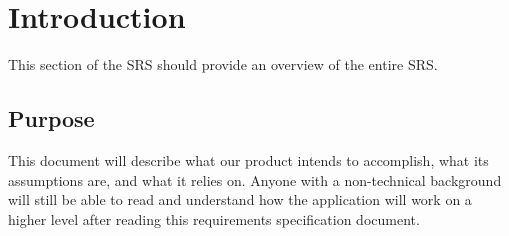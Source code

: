 \documentclass[english]{article}
\begin{document}
\vspace*{\fill} 
\vspace*{\fill} 

\newpage

\tableofcontents

\newpage

\setcounter{page}{1}
\raggedright

\section{Introduction}
\label{sec:introduction}

This section of the SRS should provide an overview of the entire SRS.

\subsection{Purpose}
\label{sub:purpose}
	
	This document will describe what our product intends to accomplish, what its assumptions 
	are, and what it relies on. Anyone with a non-technical background will still be able to read
	and understand  how the application will work on a higher level after reading this requirements
	specification document.
	
\end{document}
